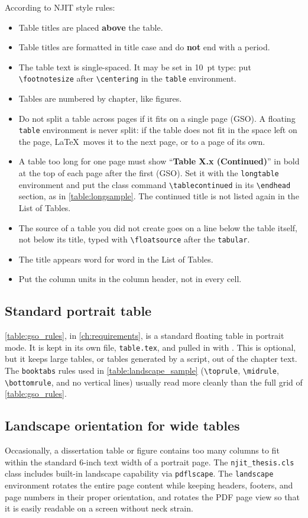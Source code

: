 According to NJIT style rules:
\begin{itemize}
\item Table titles are placed \textbf{above} the table.
\item Table titles are formatted in title case and do \textbf{not} end with a period.
\item The table text is single-spaced. It may be set in 10~pt type: put \verb+\footnotesize+ after \verb+\centering+ in the \texttt{table} environment.
\item Tables are numbered by chapter, like figures.
\item Do not split a table across pages if it fits on a single page (GSO). A floating \texttt{table} environment is never split: if the table does not fit in the space left on the page, \LaTeX\ moves it to the next page, or to a page of its own.
\item A table too long for one page must show ``\textbf{Table X.x (Continued)}'' in bold at the top of each page after the first (GSO). Set it with the \texttt{longtable} environment and put the class command \verb+\tablecontinued+ in its \verb+\endhead+ section, as in \cref{table:longsample}. The continued title is not listed again in the List of Tables.
\item The source of a table you did not create goes on a line below the table itself, not below its title, typed with \verb+\floatsource+ after the \texttt{tabular}.
\item The title appears word for word in the List of Tables.
\item Put the column units in the column header, not in every cell.
\end{itemize}

\subsection{Standard portrait table}
\cref{table:gso_rules}, in \cref{ch:requirements}, is a standard floating table in portrait mode. It is kept in its own file, \texttt{table.tex}, and pulled in with \verb++. This is optional, but it keeps large tables, or tables generated by a script, out of the chapter text. The \texttt{booktabs} rules used in \cref{table:landscape_sample} (\verb+\toprule+, \verb+\midrule+, \verb+\bottomrule+, and no vertical lines) usually read more cleanly than the full grid of \cref{table:gso_rules}.

\subsection{Landscape orientation for wide tables}
\label{subsec:landscape}
Occasionally, a dissertation table or figure contains too many columns to fit within the standard 6-inch text width of a portrait page. The \texttt{njit\_thesis.cls} class includes built-in landscape capability via \texttt{pdflscape}. The \texttt{landscape} environment rotates the entire page content while keeping headers, footers, and page numbers in their proper orientation, and rotates the PDF page view so that it is easily readable on a screen without neck strain.

